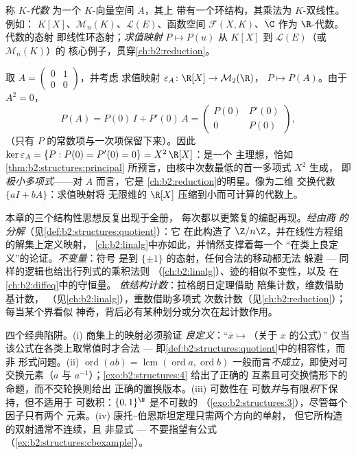 \begin{definition}[代数]\label{def:b2:structures:algebra}
称 \emph{$K$-代数} 为一个 $K$-向量空间 $A$，其上
带有一个环结构，其乘法为 $K$-双线性。例如：
$K[X]$、$\mathcal{M}_n(K)$、$\mathcal{L}(E)$、函数空间
$\mathcal{F}(X, K)$、$\C$ 作为 $\R$-代数。代数的态射
即线性环态射；\emph{求值映射} $P \mapsto P(u)$
从 $K[X]$ 到 $\mathcal{L}(E)$（或 $\mathcal{M}_n(K)$）的
核心例子，贯穿\cref{ch:b2:reduction}。
\end{definition}

\begin{example}[一个求值映射及其核]\label{ex:b2:structures:evaluation}
取 $A = \begin{pmatrix}0 & 1\\ 0 & 0\end{pmatrix}$，并考虑
求值映射 $\varepsilon_A \colon \R[X] \to \mathcal{M}_2(\R)$，
$P \mapsto P(A)$。由于 $A^2 = 0$，
\[
P(A) = P(0)\,I + P'(0)\,A =
\begin{pmatrix} P(0) & P'(0)\\ 0 & P(0)\end{pmatrix},
\]
（只有 $P$ 的常数项与一次项保留下来）。因此
$\ker\varepsilon_A = \{P : P(0) = P'(0) = 0\} = X^2\,\R[X]$：是一个
主理想，恰如\cref{thm:b2:structures:principal}
所预言，由核中次数最低的首一多项式 $X^2$ 生成，
即\emph{极小多项式}——对 $A$ 而言，它是
\cref{ch:b2:reduction}的明星。像为二维
交换代数 $\{aI + bA\}$：求值映射将
无限维的 $\R[X]$ 压缩到小而可计算的代数上。
\end{example}

\begin{remark}[展望：值得留意的三条主旋律]\label{rem:b2:structures:perspectives}
本章的三个结构性思想反复出现于全册，
每次都以更繁复的编配再现。\emph{经由商
的分解}（见\cref{def:b2:structures:quotient}）：它
在此构造了 $\Z/n\Z$，并在线性方程组的解集上定义映射，
\cref{ch:b2:linalg}中亦如此，并悄然支撑着每一个
“在类上良定义”的论证。\emph{不变量}：符号
是到 $\{\pm1\}$ 的态射，任何合法的移动都无法
躲避 --- 同样的逻辑也给出行列式的乘积法则
（\cref{ch:b2:linalg}）、迹的相似不变性，以及
在\cref{ch:b2:diffeq}中的守恒量。
\emph{依结构计数}：拉格朗日定理借助
陪集计数，维数借助基计数，
（见\cref{ch:b2:linalg}），重数借助多项式
次数计数（见\cref{ch:b2:reduction}）；每当某个界看似
神奇，背后必有某种划分或分次在起计数作用。
\end{remark}

\begin{remark}[常见陷阱]\label{rem:b2:structures:pitfalls}
四个经典陷阱。(i) 商集上的映射必须验证
\emph{良定义}：“$\overline x \mapsto$（关于 $x$ 的公式）”
仅当该公式在各类上取常值时才合法 ---
即\cref{def:b2:structures:quotient}中的相容性，而非
形式问题。(ii) $\operatorname{ord}(ab) =
\operatorname{lcm}(\operatorname{ord}a, \operatorname{ord}b)$
一般而言\emph{不成立}，即使对可交换元素（$a$
与 $a^{-1}$）；\cref{exo:b2:structures:4} 给出了正确的
互素且可交换情形下的命题，而不交轮换则给出
正确的置换版本。(iii) 可数性在
可数\emph{并}与有限\emph{积}下保持，但不适用于
可数积：$\{0,1\}^{\N}$ 是不可数的
（\cref{exo:b2:structures:3}），尽管每个因子只有两个
元素。(iv) 康托--伯恩斯坦定理只需两个方向的单射，
但它所构造的双射通常不连续，且
非显式 --- 不要指望有公式
（\cref{ex:b2:structures:cbexample}）。
\end{remark}

